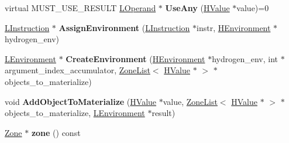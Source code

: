 \begin{DoxyCompactItemize}
\item 
virtual M\+U\+S\+T\+\_\+\+U\+S\+E\+\_\+\+R\+E\+S\+U\+LT \hyperlink{classv8_1_1internal_1_1_l_operand}{L\+Operand} $\ast$ {\bfseries Use\+Any} (\hyperlink{classv8_1_1internal_1_1_h_value}{H\+Value} $\ast$value)=0\hypertarget{classv8_1_1internal_1_1_b_a_s_e___e_m_b_e_d_d_e_d_af63b9a0ad3976c15a83a30b41176286f}{}\label{classv8_1_1internal_1_1_b_a_s_e___e_m_b_e_d_d_e_d_af63b9a0ad3976c15a83a30b41176286f}

\item 
\hyperlink{classv8_1_1internal_1_1_l_instruction}{L\+Instruction} $\ast$ {\bfseries Assign\+Environment} (\hyperlink{classv8_1_1internal_1_1_l_instruction}{L\+Instruction} $\ast$instr, \hyperlink{classv8_1_1internal_1_1_h_environment}{H\+Environment} $\ast$hydrogen\+\_\+env)\hypertarget{classv8_1_1internal_1_1_b_a_s_e___e_m_b_e_d_d_e_d_a7ad2a63fdac30d9fcca11b8f90fbc2b4}{}\label{classv8_1_1internal_1_1_b_a_s_e___e_m_b_e_d_d_e_d_a7ad2a63fdac30d9fcca11b8f90fbc2b4}

\item 
\hyperlink{classv8_1_1internal_1_1_l_environment}{L\+Environment} $\ast$ {\bfseries Create\+Environment} (\hyperlink{classv8_1_1internal_1_1_h_environment}{H\+Environment} $\ast$hydrogen\+\_\+env, int $\ast$argument\+\_\+index\+\_\+accumulator, \hyperlink{classv8_1_1internal_1_1_zone_list}{Zone\+List}$<$ \hyperlink{classv8_1_1internal_1_1_h_value}{H\+Value} $\ast$ $>$ $\ast$objects\+\_\+to\+\_\+materialize)\hypertarget{classv8_1_1internal_1_1_b_a_s_e___e_m_b_e_d_d_e_d_adaf382c6ce15c486f4b79b1b3fe37e8b}{}\label{classv8_1_1internal_1_1_b_a_s_e___e_m_b_e_d_d_e_d_adaf382c6ce15c486f4b79b1b3fe37e8b}

\item 
void {\bfseries Add\+Object\+To\+Materialize} (\hyperlink{classv8_1_1internal_1_1_h_value}{H\+Value} $\ast$value, \hyperlink{classv8_1_1internal_1_1_zone_list}{Zone\+List}$<$ \hyperlink{classv8_1_1internal_1_1_h_value}{H\+Value} $\ast$ $>$ $\ast$objects\+\_\+to\+\_\+materialize, \hyperlink{classv8_1_1internal_1_1_l_environment}{L\+Environment} $\ast$result)\hypertarget{classv8_1_1internal_1_1_b_a_s_e___e_m_b_e_d_d_e_d_a1420edc788628b4105d04adf17ddc8b3}{}\label{classv8_1_1internal_1_1_b_a_s_e___e_m_b_e_d_d_e_d_a1420edc788628b4105d04adf17ddc8b3}

\item 
\hyperlink{classv8_1_1internal_1_1_zone}{Zone} $\ast$ {\bfseries zone} () const \hypertarget{classv8_1_1internal_1_1_b_a_s_e___e_m_b_e_d_d_e_d_a52fc0e306aa3628bf7e2d0c397a1f5c6}{}\label{classv8_1_1internal_1_1_b_a_s_e___e_m_b_e_d_d_e_d_a52fc0e306aa3628bf7e2d0c397a1f5c6}


\end{DoxyCompactItemize}
